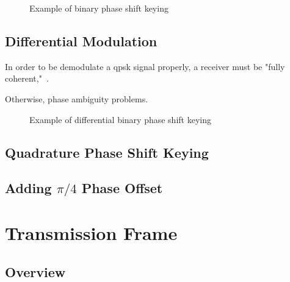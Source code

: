 \documentclass[class=report,11pt,crop=false]{standalone}
\begin{document}
\begin{figure}[htbp]
    \centering
    \captionsetup{type=figure}
    \def\svgwidth{1\linewidth}
    { %
        }
    \caption{Example of binary phase shift keying}
    \label{fig:binary-psk}
\end{figure}

\subsection{Differential Modulation}
In order to be demodulate a \gls{qpsk} signal properly, a receiver must be "fully coherent,"~\cite{Moosea}.

Otherwise, phase ambiguity problems.


\begin{figure}[htbp]
    \centering
    \captionsetup{type=figure}
    \def\svgwidth{1\linewidth}
    { %
        }
    \caption{Example of differential binary phase shift keying}
    \label{fig:differential-binary-psk}
\end{figure}

\subsection{Quadrature Phase Shift Keying}

\subsection{Adding $\pi/4$ Phase Offset}


\section{Transmission Frame}
\begin{figure}[htbp]
    \centering
    \captionsetup{type=figure}
    \def\svgwidth{1\linewidth}
    { %
    \scriptsize
    }
    \caption{}
    \label{fig:transmission-frame-illustration}
\end{figure}



\subsection{Overview}
\end{document}
